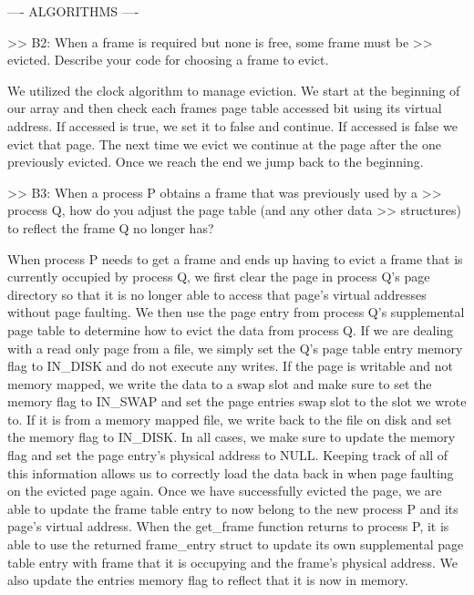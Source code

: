 ---- ALGORITHMS ----

>> B2: When a frame is required but none is free, some frame must be
>> evicted.  Describe your code for choosing a frame to evict.

 We utilized the clock algorithm to manage eviction. We start at the beginning
 of our array and then check each frames page table accessed bit using its
 virtual address. If accessed is true, we set it to false and continue. If
 accessed is false we evict that page. The next time we evict we continue
 at the page after the one previously evicted. Once we reach the end we jump
 back to the beginning.


>> B3: When a process P obtains a frame that was previously used by a
>> process Q, how do you adjust the page table (and any other data
>> structures) to reflect the frame Q no longer has?

When process P needs to get a frame and ends up having to evict a frame that
is currently occupied by process Q, we first clear the page in process Q's
page directory so that it is no longer able to access that page's virtual
addresses without page faulting. We then use the page entry from process Q's
supplemental page table to determine how to evict the data from process Q.
If we are dealing with a read only page from a file, we simply set the Q's
page table entry memory flag to IN_DISK and do not execute any writes. If
the page is writable and not memory mapped, we write the data to a swap slot
and make sure to set the memory flag to IN_SWAP and set the page entries
swap slot to the slot we wrote to. If it is from a memory mapped file, we
write back to the file on disk and set the memory flag to IN_DISK. In all
cases, we make sure to update the memory flag and set the page entry's
physical address to NULL. Keeping track of all of this information allows
us to correctly load the data back in when page faulting on the evicted page
again. Once we have successfully evicted the page, we are able to update the
frame table entry to now belong to the new process P and its page's virtual
address. When the get_frame function returns to process P, it is able to use
the returned frame_entry struct to update its own supplemental page table
entry with frame that it is occupying and the frame's physical address. We
also update the entries memory flag to reflect that it is now in memory.

